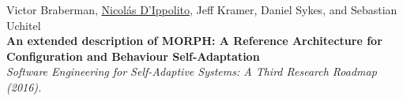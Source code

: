 
\item {\footnotesize Victor Braberman, \underline{Nicol\'as D'Ippolito}, Jeff Kramer, Daniel Sykes, and Sebastian Uchitel}\\ 
\textbf{An extended description of MORPH: A Reference Architecture for Configuration and Behaviour Self-Adaptation}\\
{\em Software Engineering for Self-Adaptive Systems: A Third Research Roadmap (2016).}\\
